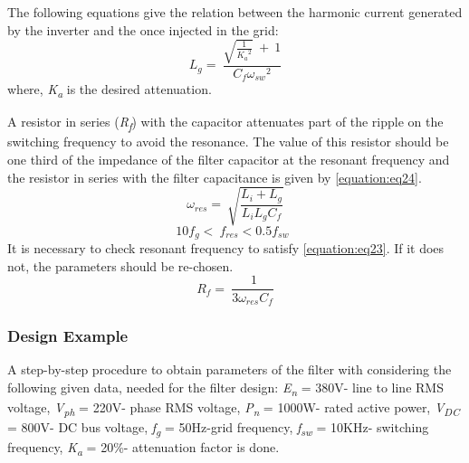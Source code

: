 \documentclass[12pt,a4paper]{book}
\begin{document}
The following equations give the relation between the harmonic current generated by the inverter and the once injected in the grid:
\begin{equation}
  L_{g} = \ \frac{\sqrt{\frac{1}{{K_{a}}^{2}}}\  + \ 1}{C_{f}{\omega_{sw}}^{2}}
  \label{equation:eq21}
\end{equation}
where, \emph{K\textsubscript{a}} is the desired attenuation.

A resistor in series (\emph{R\textsubscript{f}}) with the capacitor attenuates part of the ripple on the switching frequency to avoid the resonance. The value of this resistor should be one third of the impedance of the filter capacitor at the resonant frequency and the resistor in series with the filter capacitance is given by \ref{equation:eq24}.
\begin{equation}
  \omega_{res} = \ \sqrt{\frac{L_{i} + L_{g}}{L_{i}L_{g}C_{f}}}
  \label{equation:eq22}
\end{equation}
\begin{equation}
  {10f}_{g} < \ f_{res} < 0.5f_{sw}\ \
  \label{equation:eq23}
\end{equation}
It is necessary to check resonant frequency to satisfy \ref{equation:eq23}. If it does not, the parameters should be re-chosen.
\begin{equation}
  R_{f} = \ \frac{\ 1}{3\omega_{res}C_{f}}
  \label{equation:eq24}
\end{equation}

\subsubsection{Design Example}
A step-by-step procedure to obtain parameters of the filter with considering the following given data, needed for the filter design: \emph{E\textsubscript{n}} = 380V- line to line RMS voltage, \emph{V\textsubscript{ph}} = 220V- phase RMS voltage, \emph{P\textsubscript{n}} = 1000W- rated active power, \emph{V\textsubscript{DC}} = 800V- DC bus voltage, \emph{f\textsubscript{g}} = 50Hz-grid frequency, \emph{f\textsubscript{sw}} = 10KHz- switching frequency, \emph{K\textsubscript{a }}= 20\%- attenuation factor is done.
\end{document}
